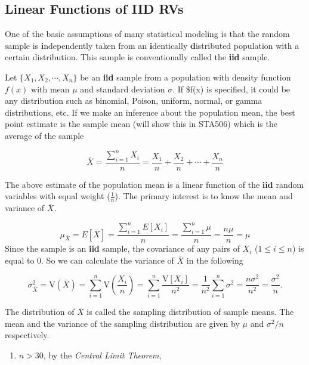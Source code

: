 \documentclass[
]{book}
\providecommand{\tightlist}{%
  \setlength{\itemsep}{0pt}\setlength{\parskip}{0pt}}
\begin{document}
\hfill\break

\hypertarget{linear-functions-of-iid-rvs}{%
\subsection{Linear Functions of IID RVs}\label{linear-functions-of-iid-rvs}}

One of the basic assumptions of many statistical modeling is that the random sample is \textbf{i}ndependently taken from an \textbf{i}dentically \textbf{d}istributed population with a certain distribution. This sample is conventionally called the \textbf{iid} sample.

Let \(\{X_1, X_2, \cdots, X_n \}\) be an \textbf{iid} sample from a population with density function \(f(x)\) with mean \(\mu\) and standard deviation \(\sigma\). If \$f(x) is specified, it could be any distribution such as binomial, Poison, uniform, normal, or gamma distributions, etc. If we make an inference about the population mean, the best point estimate is the sample mean (will show this in STA506) which is the average of the sample

\[
\bar{X} = \frac{\sum_{i=1}^n X_i}{n} = \frac{X_1}{n} + \frac{X_2}{n} + \cdots + \frac{X_n}{n}
\]

The above estimate of the population mean is a linear function of the \textbf{iid} random variables with equal weight (\(\frac{1}{n}\)). The primary interest is to know the mean and variance of \(\bar{X}\).

\[
\mu_{\bar{X}} = E\left[ \bar{X} \right] = \frac{\sum_{i=1}^n E[X_i]}{n} = \frac{\sum_{i=1}^n \mu}{n} = \frac{n\mu}{n} = \mu
\]
Since the sample is an \textbf{iid} sample, the covariance of any pairs of \(X_i\) (\(1 \le i \le n\)) is equal to 0. So we can calculate the variance of \(\bar{X}\) in the following

\[
\sigma_{\bar{X}}^2=\text{V}(\bar{X}) = \sum_{i=1}^n \text{V}\left( \frac{X_i}{n} \right) = \sum_{i=1}^n  \frac{\text{V}[X_i]}{n^2} = \frac{1}{n^2}\sum_{i=1}^n \sigma^2
 = \frac{n\sigma^2}{n^2} = \frac{\sigma^2}{n}.
 \]

The distribution of \(\bar{X}\) is called the sampling distribution of sample means. The mean and the variance of the sampling distribution are given by \(\mu\) and \(\sigma^2/n\) respectively.

\hfill\break

\begin{enumerate}
\def\labelenumi{\arabic{enumi}.}
\tightlist
\item
  \(n > 30\), by the \emph{Central Limit Theorem},
\end{enumerate}
\end{document}
